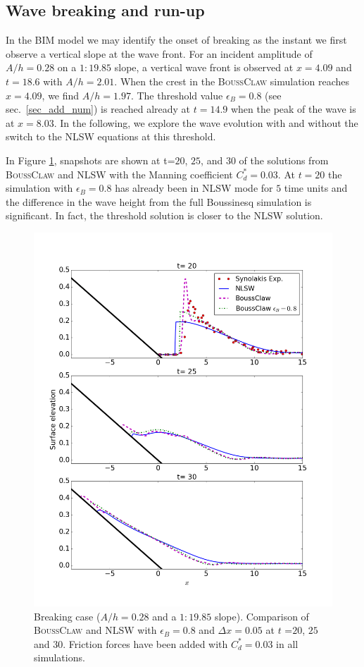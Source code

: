 \documentclass[review]{elsarticle}
\newcommand{\BoussClaw}{\textsc{BoussClaw} }
\begin{document}
\subsection{Wave breaking and run-up}
\label{sec:discuss_breaking}
In the BIM model we may identify the onset of breaking as the instant we first observe a vertical slope at the wave front.
For an incident amplitude of $A/h=0.28$ on a $1:19.85$ slope,
a vertical wave front is observed at $x=4.09$ and $t=18.6$ with $A/h=2.01$.
When the crest in the \BoussClaw simulation reaches $x=4.09$, 
we find $A/h=1.97$.
The threshold value $\epsilon_B=0.8$ (see sec.~\ref{sec_add_num})
is  reached already at $t=14.9$
when the peak of the wave is at $x=8.03$.
In the following, we explore the wave evolution with and without
the switch to the NLSW equations at this threshold.


In Figure \ref{fig:boussclaw_th08}, snapshots are shown at 
t=$20$, $25$, and $30$ of the solutions from \BoussClaw and NLSW
with the Manning coefficient $C_d^*=0.03$.
At $t=20$ the simulation with $\epsilon_B=0.8$ has already been in NLSW mode for $5$ time units and the difference in the wave height 
from the full Boussinesq simulation is significant. In fact, the threshold solution is closer to the NLSW solution.

\begin{figure}[tbh!]
	\centering
	\includegraphics[width=.75\textwidth]{_fig/bim_boussclaw_etaB8}
	\caption{Breaking case ($A/h=0.28$ and a $1:19.85$ slope).
                 Comparison of \BoussClaw and NLSW 
		with $\epsilon_B=0.8$ and $\Delta x = 0.05$ at $t$ =$20$, $25$ and $30$.
		Friction forces have been added with $C_d^*=0.03$ in all simulations.}
	\label{fig:boussclaw_th08}
\end{figure}
\end{document}
